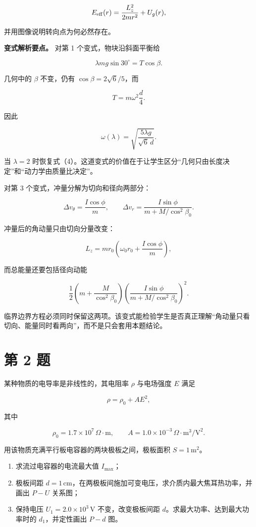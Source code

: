 \documentclass[12pt,a4paper,UTF8]{ctexart}
\newcommand{\tightlist}{\setlength{\itemsep}{0pt}\setlength{\parskip}{0pt}}
\begin{document}
\[
E_{\rm eff}(r)=\frac{L_z^2}{2mr^2}+U_g(r),
\]

并用图像说明转向点为何必然存在。

\textbf{变式解析要点。} 对第 1 个变式，物块沿斜面平衡给

\[
\lambda mg\sin30^\circ=T\cos\beta.
\]

几何中的 \(\beta\) 不变，仍有 \(\cos\beta=2\sqrt6/5\)，而

\[
T=m\omega^2\frac d4.
\]

因此

\[
\omega(\lambda)
=\sqrt{\frac{5\lambda g}{\sqrt6\,d}}.
\]

当 \(\lambda=2\)
时恢复式（4）。这道变式的价值在于让学生区分``几何只由长度决定''和``动力学由质量比决定''。

对第 3 个变式，冲量分解为切向和径向两部分：

\[
\Delta v_\theta=\frac{I\cos\phi}{m},
\qquad
\Delta v_r=\frac{I\sin\phi}{m+M/\cos^2\beta_0}.
\]

冲量后的角动量只由切向分量改变：

\[
L_z
=mr_0\left(\omega_0r_0+\frac{I\cos\phi}{m}\right),
\]

而总能量还要包括径向动能

\[
\frac12\left(m+\frac{M}{\cos^2\beta_0}\right)\left(\frac{I\sin\phi}{m+M/\cos^2\beta_0}\right)^2.
\]

临界边界方程必须同时保留这两项。该变式能检验学生是否真正理解``角动量只看切向、能量同时看两向''，而不是只会套用本题结论。

\newpage

\section{第 2 题}\label{ux7b2c-2-ux9898}

某种物质的电导率是非线性的，其电阻率 \(\rho\) 与电场强度 \(E\) 满足

\[
\rho=\rho_0+AE^2,
\]

其中

\[
\rho_0=1.7\times10^7\,\Omega\cdot\mathrm m,
\qquad
A=1.0\times10^{-3}\,\Omega\cdot\mathrm m^3/\mathrm V^2.
\]

用该物质充满平行板电容器的两块极板之间，极板面积 \(S=1\,\mathrm{m^2}\)。

\begin{enumerate}
\def\labelenumi{\arabic{enumi}.}
\tightlist
\item
  求流过电容器的电流最大值 \(I_{\max}\)；
\item
  极板间距
  \(d=1\,\mathrm{cm}\)，在两极板间施加可变电压，求介质内最大焦耳热功率，并画出
  \(P-U\) 关系图；
\item
  保持电压 \(U_1=2.0\times10^3\,\mathrm V\) 不变，改变极板间距
  \(d\)。求最大功率、达到最大功率时的 \(d_1\)，并定性画出 \(P-d\) 图。
\end{enumerate}
\end{document}
